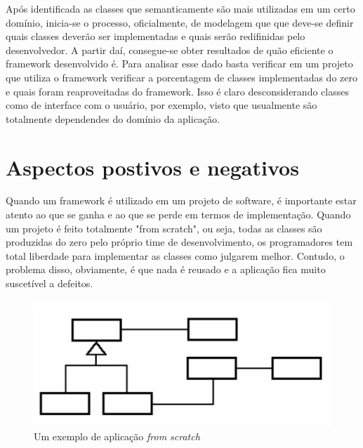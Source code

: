 \documentclass[
    12pt,       %
    openright,      %
    twoside,      %
    a4paper,      %
    english,      %
    french,       %
    spanish,      %
    brazil,       %
    ]{abntex2}
\begin{document}
          Após identificada as classes que semanticamente são mais utilizadas em um
          certo domínio, inicia-se o processo, oficialmente, de modelagem que
          que deve-se definir quais classes deverão ser implementadas e quais serão
          redifinidas pelo desenvolvedor. A partir daí, consegue-se obter resultados
          de quão eficiente o framework desenvolvido é. Para analisar esse dado
          basta verificar em um projeto que utiliza o framework verificar a porcentagem
          de classes implementadas do zero e quais foram reaproveitadas do framework.
          Isso é claro desconsiderando classes como de interface com o usuário, por
          exemplo, visto que usualmente são totalmente dependendes do domínio da aplicação.

      \section{Aspectos postivos e negativos}
          Quando um framework é utilizado em um projeto de software, é importante estar
          atento ao que se ganha e ao que se perde em termos de implementação. Quando
          um projeto é feito totalmente "from scratch", ou seja, todas as classes são
          produzidas do zero pelo próprio time de desenvolvimento, os programadores tem
          total liberdade para implementar as classes como julgarem melhor. Contudo, o
          problema disso, obviamente, é que nada é reusado e a aplicação fica muito
          suscetível a defeitos.

          \begin{figure}[htbp]
              \begin{center}
                  \includegraphics[width=1.0\textwidth]{img/scratch.png}
              \end{center}
              \caption{\label{fig:passaro}Um exemplo de aplicação \textit{from scratch}}
          \end{figure}
\end{document}
